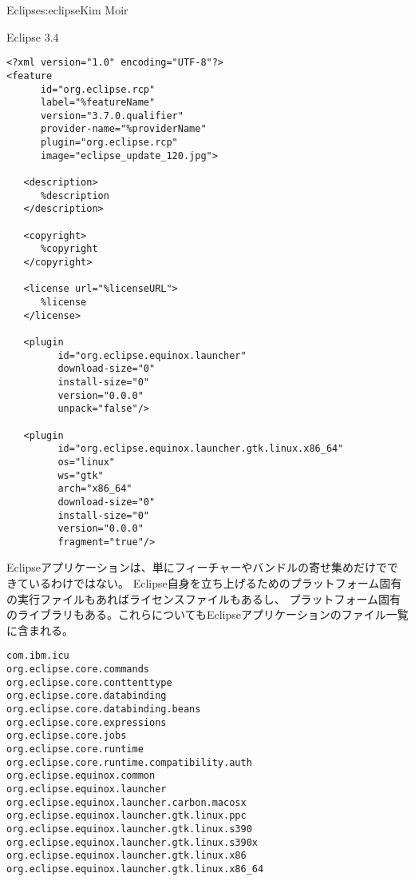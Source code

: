 \begin{aosachapter}{Eclipse}{s:eclipse}{Kim Moir}
\begin{aosasect1}{Eclipse 3.4}
\begin{verbatim}
<?xml version="1.0" encoding="UTF-8"?>
<feature
      id="org.eclipse.rcp"
      label="%featureName"
      version="3.7.0.qualifier"
      provider-name="%providerName"
      plugin="org.eclipse.rcp"
      image="eclipse_update_120.jpg">

   <description>
      %description
   </description>

   <copyright>
      %copyright
   </copyright>

   <license url="%licenseURL">
      %license
   </license>
 
   <plugin
         id="org.eclipse.equinox.launcher"
         download-size="0"
         install-size="0"
         version="0.0.0"
         unpack="false"/>

   <plugin
         id="org.eclipse.equinox.launcher.gtk.linux.x86_64"
         os="linux"
         ws="gtk"
         arch="x86_64"
         download-size="0"
         install-size="0"
         version="0.0.0"
         fragment="true"/>
\end{verbatim}

Eclipseアプリケーションは、単にフィーチャーやバンドルの寄せ集めだけでできているわけではない。
Eclipse自身を立ち上げるためのプラットフォーム固有の実行ファイルもあればライセンスファイルもあるし、
プラットフォーム固有のライブラリもある。これらについてもEclipseアプリケーションのファイル一覧に含まれる。

\begin{verbatim}
com.ibm.icu
org.eclipse.core.commands
org.eclipse.core.conttenttype
org.eclipse.core.databinding
org.eclipse.core.databinding.beans
org.eclipse.core.expressions
org.eclipse.core.jobs
org.eclipse.core.runtime
org.eclipse.core.runtime.compatibility.auth
org.eclipse.equinox.common
org.eclipse.equinox.launcher
org.eclipse.equinox.launcher.carbon.macosx
org.eclipse.equinox.launcher.gtk.linux.ppc
org.eclipse.equinox.launcher.gtk.linux.s390
org.eclipse.equinox.launcher.gtk.linux.s390x
org.eclipse.equinox.launcher.gtk.linux.x86
org.eclipse.equinox.launcher.gtk.linux.x86_64
\end{verbatim}



\end{aosasect1}
\end{aosachapter}
